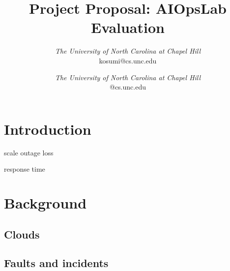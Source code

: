 \documentclass[conference]{IEEEtran}
\begin{document}
\title{Project Proposal: AIOpsLab Evaluation}
\author{
\textit{The University of North Carolina at
Chapel Hill}\\
kosumi@cs.unc.edu
\and
{}
\textit{The University of North Carolina at
Chapel Hill}\\
@cs.unc.edu}

\maketitle



\section{Introduction}

scale 
outage
loss 

response time  


\section{Background}

\subsection{Clouds}

\subsection{Faults and incidents}
\end{document}
